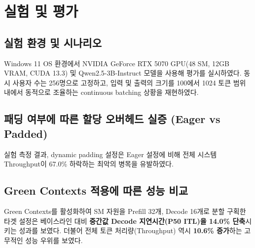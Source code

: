 \documentclass[preprint]{kcc} %
\begin{document}
\section{실험 및 평가}
\subsection{실험 환경 및 시나리오}
Windows 11 OS 환경에서 NVIDIA GeForce RTX 5070 GPU(48 SM, 12GB VRAM, CUDA 13.3) 및 Qwen2.5-3B-Instruct 모델을 사용해 평가를 실시하였다. 동시 사용자 수는 256명으로 고정하고, 입력 및 출력의 크기를 100에서 1024 토큰 범위 내에서 동적으로 조율하는 continuous batching 상황을 재현하였다.

\subsection{패딩 여부에 따른 할당 오버헤드 실증 (Eager vs Padded)}
실험 측정 결과, dynamic padding 설정은 Eager 설정에 비해 전체 시스템 Throughput이 67.0\% 하락하는 최악의 병목을 유발하였다.

\begin{table}[h]
\centering
\caption{셰이프 패딩 적용 유무에 따른 E2E 서빙 효율성 비교}
\end{table}

\subsection{Green Contexts 적용에 따른 성능 비교}
Green Contexts를 활성화하여 SM 자원을 Prefill 32개, Decode 16개로 분할 구획한 타겟 설정은 베이스라인 대비 \textbf{중간값 Decode 지연시간(P50 ITL)을 14.0\% 단축}시키는 성과를 보였다. 더불어 전체 토큰 처리량(Throughput) 역시 \textbf{10.6\% 증가}하는 고무적인 성능 우위를 보였다. 
\end{document}
